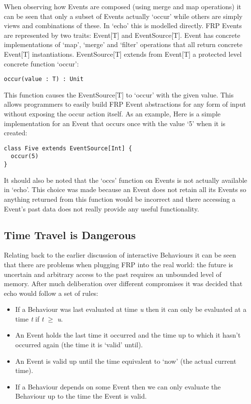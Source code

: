       When observing how Events are composed (using merge and map operations) it can be seen that
      only a subset of Events actually `occur' while others are simply views and combinations of these.
      In `echo' this is modelled directly. FRP Events are represented by two traits: Event[T] and EventSource[T].
      Event has concrete implementations of `map', `merge' and `filter' operations that
      all return concrete Event[T] instantiations. EventSource[T] extends
      from Event[T] a protected level concrete function `occur':
      
\begin{verbatim}
occur(value : T) : Unit
\end{verbatim}  

      This function causes the EventSource[T] to `occur' with the given value. This allows programmers
      to easily build FRP Event abstractions for any form of input without exposing the occur action itself.
      As an example, Here is a simple implementation for an Event that occurs once with the value `5' when it 
      is created:
      
\begin{verbatim}
class Five extends EventSource[Int] {
  occur(5)
}
\end{verbatim}

      It should also be noted that the `occs' function on Events is not actually available in `echo'. This
      choice was made because an Event does not retain all its Events so anything returned from this 
      function would be incorrect and there accessing a Event's past data does not really
      provide any useful functionality.

    \subsection{Time Travel is Dangerous}
      Relating back to the earlier discussion of interactive Behaviours it can be seen
      that there are problems when plugging FRP into the real world: the future is uncertain and
      arbitrary access to the past requires an unbounded level of memory. After much deliberation
      over different compromises it was decided that echo would follow a set of rules:
      
      \begin{itemize}
        \item If a Behaviour was last evaluated at time \emph{u} then it can only be evaluated at
        a time \emph{t} if \emph{t} $\geq$ \emph{u}.
        \item An Event holds the last time it occurred and the time up to which it hasn't occurred
        again (the time it is `valid' until).
        \item An Event is valid up until the time equivalent to `now' (the actual current time).
        \item If a Behaviour depends on some Event then we can only evaluate the Behaviour up to
        the time the Event is valid.
      \end{itemize}
      

